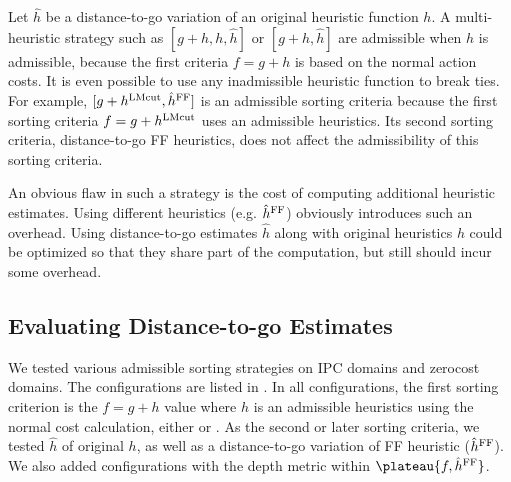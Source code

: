 Let $\hat{h}$ be a distance-to-go variation of an original heuristic function $h$.
A multi-heuristic strategy such as $[g+h,h,\hat{h}]$ or $[g+h,\hat{h}]$
are admissible when $h$ is admissible, because the first criteria $f=g+h$ is
based on the normal action costs.
It is even possible to use any inadmissible heuristic function to break
ties. For example, $[g+h^{\text{LMcut}},\hat{h}^{\text{FF}}]$ is an admissible sorting criteria
because the first sorting criteria $f=g+h^{\text{LMcut}}$ uses an admissible
\lmcut heuristics. Its second sorting criteria, distance-to-go FF
heuristics, does not affect the admissibility of this sorting criteria.

An obvious flaw in such a strategy is the cost of computing additional
heuristic estimates. Using different heuristics (e.g. $\hat{h}^{\text{FF}}$) obviously introduces such an
overhead. Using distance-to-go estimates $\hat{h}$ along with
original heuristics $h$ could be optimized so that they share part of
the computation, but still should incur some overhead.

\subsection{Evaluating Distance-to-go Estimates}

We tested various admissible sorting strategies on IPC domains and zerocost domains.
The configurations are listed in . 
In all configurations, the first sorting criterion is the $f=g+h$ value
where $h$ is an admissible heuristics using the normal cost calculation, either \lmcut or \mands.
As the second or later sorting criteria,
we tested $\hat{h}$ of original $h$, as well as a distance-to-go variation of FF
heuristic ($\hat{h}^{\text{FF}}$).
We also added configurations with the depth metric within
$\plateau{f,\hat{h}^{\text{\ff}}}$.


